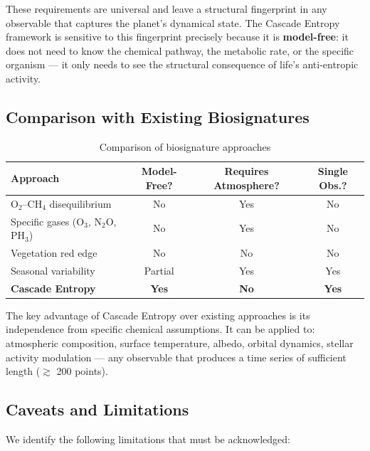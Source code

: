 \documentclass[12pt,a4paper]{article}
\begin{document}
These requirements are universal and leave a structural fingerprint in any
observable that captures the planet's dynamical state. The Cascade Entropy
framework is sensitive to this fingerprint precisely because it is
\textbf{model-free}: it does not need to know the chemical pathway, the
metabolic rate, or the specific organism --- it only needs to see the
structural consequence of life's anti-entropic activity.

\subsection{Comparison with Existing Biosignatures}

\begin{table}[htbp]
  \centering
  \caption{Comparison of biosignature approaches}
  \label{tab:comparison}
  \begin{tabular}{lccc}
    \toprule
    \textbf{Approach} & \textbf{Model-Free?} &
    \textbf{Requires Atmosphere?} & \textbf{Single Obs.?} \\
    \midrule
    O$_2$--CH$_4$ disequilibrium & No & Yes & No \\
    Specific gases (O$_3$, N$_2$O, PH$_3$) & No & Yes & No \\
    Vegetation red edge & No & No & No \\
    Seasonal variability & Partial & Yes & Yes \\
    \textbf{Cascade Entropy} & \textbf{Yes} & \textbf{No} &
    \textbf{Yes} \\
    \bottomrule
  \end{tabular}
\end{table}

The key advantage of Cascade Entropy over existing approaches is its
independence from specific chemical assumptions. It can be applied to:
atmospheric composition, surface temperature, albedo, orbital dynamics,
stellar activity modulation --- any observable that produces a time series
of sufficient length ($\gtrsim$ 200 points).

\subsection{Caveats and Limitations}

We identify the following limitations that must be acknowledged:
\end{document}
